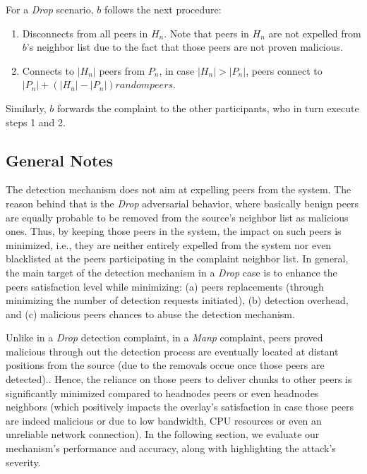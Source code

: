 For a \textit{Drop} scenario, $b$ follows the next procedure:
\begin{enumerate}
 \item Disconnects from all peers in $H_n$. Note that peers in $H_n$ are not expelled from $b$'s neighbor list due to the fact that those peers are not proven malicious.
 \item Connects to $|H_n|$ peers from $P_n$, in case $|H_n|>|P_n|$, peers connect to $|P_n|+(|H_n|-|P_n|)random peers$.
\end{enumerate}
Similarly, $b$ forwards the complaint to the other participants, who in turn execute steps 1 and 2.

\subsection{General Notes}
The detection mechanism does not aim at expelling peers from the system.
The reason behind that is the \textit{Drop} adversarial behavior, where basically benign peers are equally probable to be removed from the source's neighbor list as malicious ones.
Thus, by keeping those peers in the system, the impact on such peers is minimized, i.e., they are neither entirely expelled from the system nor even blacklisted at the peers participating in the complaint neighbor list.
In general, the main target of the detection mechanism in a \textit{Drop} case is to enhance the peers satisfaction level while minimizing: (a) peers replacements (through minimizing the number of detection requests initiated), (b) detection overhead, and (c) malicious peers chances to abuse the detection mechanism.

Unlike in a \textit{Drop} detection complaint, in a \textit{Manp} complaint, peers proved malicious through out the detection process are eventually located at distant positions from the source (due to the removals occue once those peers are detected)..
Hence, the reliance on those peers to deliver chunks to other peers is significantly minimized compared to headnodes peers or even headnodes neighbors (which positively impacts the overlay's satisfaction in case those peers are indeed malicious or due to low bandwidth, CPU resources or even an unreliable network connection).
In the following section, we evaluate our mechanism's performance and accuracy, along with highlighting the attack's severity.



